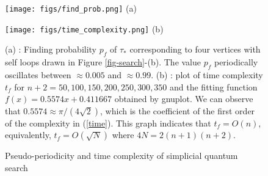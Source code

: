 \documentclass[a4paper,12pt]{article}
\numberwithin{equation}{section}
\begin{document}
\begin{figure}[htbp]\em
\begin{minipage}{0.5\hsize}
\centering
\texttt{[image: figs/find\_prob.png]}
(a)
\end{minipage}
\begin{minipage}{0.5\hsize}
\centering
\texttt{[image: figs/time\_complexity.png]}
(b)
\end{minipage}
\caption{Pseudo-periodicity and time complexity of simplicial quantum search}
\label{fig-time}
(a) : Finding probability $p_f$ of $\tau_\ast$ corresponding to four vertices with self loops drawn in Figure \ref{fig-search}-(b). 
The value $p_f$ periodically oscillates between $\approx 0.005$ and $\approx 0.99$.
(b) : plot of time complexity $t_f$ for $n+2= 50, 100, 150, 200, 250, 300, 350$ and the fitting function $f(x) = 0.5574x + 0.411667$ obtained by gnuplot. 
We can observe that $0.5574\approx \pi/(4\sqrt{2})$, which is the coefficient of the first order of the complexity in (\ref{time}). 
This graph indicates that $t_f = O(n)$, equivalently, $t_f = O(\sqrt{N})$ where $4N=2(n+1)(n+2)$.
\end{figure}
\end{document}
